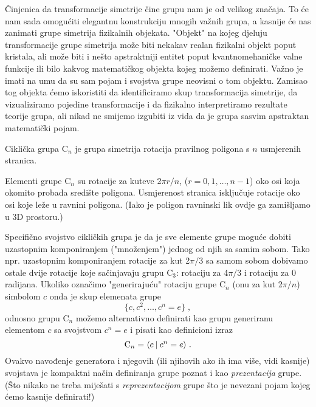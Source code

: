 Činjenica da transformacije simetrije čine grupu nam je od velikog
značaja. To će nam sada omogućiti elegantnu konstrukciju mnogih važnih
grupa, a kasnije će nas zanimati grupe simetrija fizikalnih
objekata.
"Objekt" na kojeg djeluju transformacije grupe simetrija može biti
nekakav realan fizikalni objekt poput kristala, ali može biti i
nešto apstraktniji entitet poput kvantnomehaničke valne funkcije
ili bilo kakvog matematičkog objekta kojeg možemo definirati.
Važno je imati na umu da su sam pojam i svojstva grupe neovisni o
tom objektu. Zamisao tog objekta ćemo iskoristiti da identificiramo skup transformacija
simetrije, da vizualiziramo pojedine transformacije i da
fizikalno interpretiramo rezultate teorije grupa, ali nikad
ne smijemo izgubiti iz vida da je grupa sasvim apstraktan matematički pojam.


\begin{primjer}
Ciklička grupa C$_n$ je grupa simetrija rotacija pravilnog poligona s $n$
usmjerenih stranica.
\end{primjer}

\centerline{}

Elementi grupe C$_n$ su rotacije za kuteve 2$\pi r/n$, ($r=0,1,\ldots, n-1$)
oko osi koja okomito probada središte poligona. Usmjerenost
stranica isključuje rotacije oko osi koje leže u ravnini poligona. 
(Iako je poligon ravninski lik ovdje ga zamišljamo u 3D prostoru.)

Specifično svojstvo cikličkih grupa je da je sve elemente grupe moguće
dobiti uzastopnim komponiranjem ("množenjem") jednog od njih sa samim sobom.
Tako npr. uzastopnim komponiranjem rotacije za kut 2$\pi/3$ sa samom sobom dobivamo ostale
dvije rotacije koje sačinjavaju grupu C$_3$: rotaciju za 4$\pi/3$ i
rotaciju za 0 radijana. 
Ukoliko označimo "generirajuću" rotaciju grupe C$_n$ (onu za kut 2$\pi/n$) simbolom 
$c$ onda je skup elemenata grupe
\begin{equation}
 \{c,c^2, \ldots , c^n=e \} \;,
\label{eq:cn}
\end{equation}
odnosno grupu C$_n$ možemo alternativno definirati kao grupu generiranu
elementom $c$ sa svojstvom $c^n=e$ i pisati kao definicioni izraz
\begin{equation}
 {\rm C}_n = \langle c \: | \: c^n=e \rangle \;.
\label{eq:cngp}
\end{equation}
Ovakvo navođenje generatora i njegovih (ili njihovih ako ih ima više, vidi kasnije)
svojstava je kompaktni način definiranja grupe poznat i kao \emph{prezentacija}
grupe. (Što nikako ne treba miješati s \emph{reprezentacijom} grupe što je nevezani
pojam kojeg ćemo kasnije definirati!)

